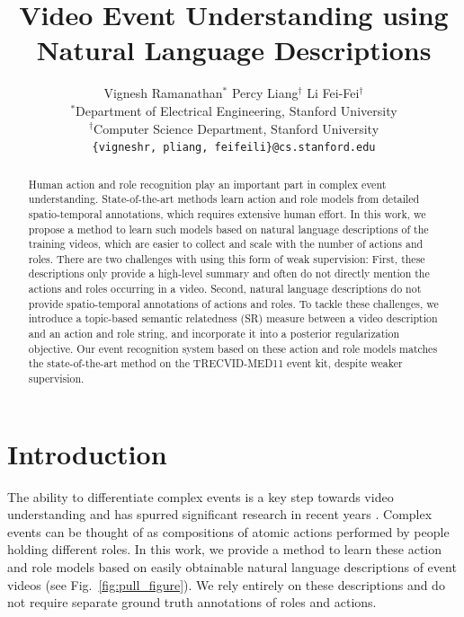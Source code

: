 \documentclass[10pt,twocolumn,letterpaper]{article}
\begin{document}
\title{Video Event Understanding using Natural Language Descriptions}

\author{Vignesh Ramanathan$^*$ \quad \quad Percy Liang$^\dagger$ \quad \quad Li Fei-Fei$^\dagger$ \\
$^*$Department of Electrical Engineering, Stanford University \\
$^\dagger$Computer Science Department, Stanford University\\
{\tt\small \{vigneshr, pliang, feifeili\}@cs.stanford.edu}
}
\maketitle

\begin{abstract}
Human action and role recognition play an important part in complex event understanding. 
State-of-the-art methods learn action and role models from detailed spatio-temporal annotations, 
which requires extensive human effort. 
In this work, we propose a method to learn such models based on natural language descriptions of the training videos, 
which are easier to collect and scale with the number of actions and roles. 
There are two challenges with using this form of weak supervision: First, these descriptions only provide a high-level summary 
and often do not directly mention the actions and roles occurring in a video. 
Second, natural language descriptions do not provide spatio-temporal annotations of actions and roles. 
To tackle these challenges, we introduce a topic-based semantic relatedness (SR) measure between a video description 
and an action and role string, and incorporate it into a posterior regularization objective. 
Our event recognition system based on these action and role models matches the state-of-the-art method on 
the TRECVID-MED11 event kit, despite weaker supervision. %
\end{abstract}

\section{Introduction}
The ability to differentiate complex events is a key step towards video
understanding and has spurred significant research in recent years
\cite{Merler_ITM12, Izadinia_ECCV12, Rohrbach_ECCV12}. Complex
events can be thought of as compositions of atomic actions performed by
people holding different roles. In this work, we provide a method to
learn these action and role models based on easily obtainable natural language
descriptions of event videos (see Fig.~\ref{fig:pull_figure}). We rely
entirely on these descriptions and do not require separate ground truth annotations
of roles and actions.
\end{document}
